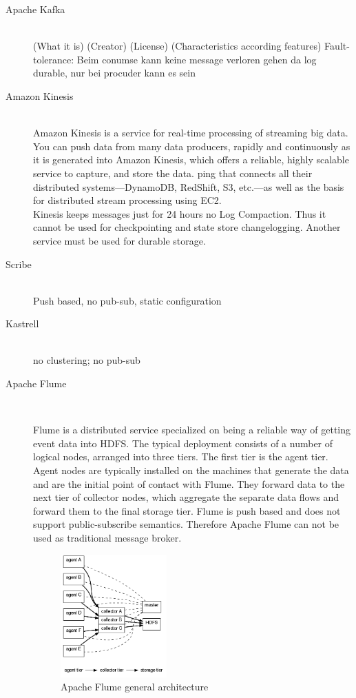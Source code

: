 \begin{description}
    \item [Apache Kafka] \hfill \\
        { (What it is) (Creator) (License) (Characteristics according features) Fault-tolerance: Beim conumse kann keine message verloren gehen da log durable, nur bei procuder kann es sein }
    \item [Amazon Kinesis] \hfill \\
    { Amazon Kinesis is a service for real-time processing of streaming big
    data. You can push data from many data producers, rapidly and continuously
as it is generated into Amazon Kinesis, which offers a reliable, highly
scalable service to capture, and store the data. ping that connects all their
distributed systems—DynamoDB, RedShift, S3, etc.—as well as the basis for
distributed stream processing using EC2. \\
 Kinesis keeps messages just for 24 hours no Log Compaction. Thus it cannot be
 used for checkpointing and state store changelogging. Another service must be
 used for durable storage.\\
    
 }
    \item [Scribe] \hfill \\
    { Push based, no pub-sub, static configuration}
    \item [Kastrell] \hfill \\
    {no clustering; no pub-sub}
    \item [Apache Flume] \hfill \\
    {Flume is a distributed service specialized on being a reliable way
    of getting event data into HDFS. The typical deployment consists of a number of
    logical nodes, arranged into three tiers. The first tier is the agent tier.
    Agent nodes are typically installed on the machines that generate the data and
    are the initial point of contact with Flume. They forward data to the
    next tier of collector nodes, which aggregate the separate data flows and
    forward them to the final storage tier. Flume is push based and does not support
    public-subscribe semantics. Therefore Apache Flume can not be used as
    traditional message broker. \cite{apacheflumeDoc}

    \begin{figure}[H]
     \centering
     \includegraphics[width=0.4\textwidth]{images/flume-architecture.png}
         \caption{Apache Flume general architecture \cite{apacheflumeDoc}}
        \label{fig:flume-architecture}
    \end{figure}

}
\end{description}
